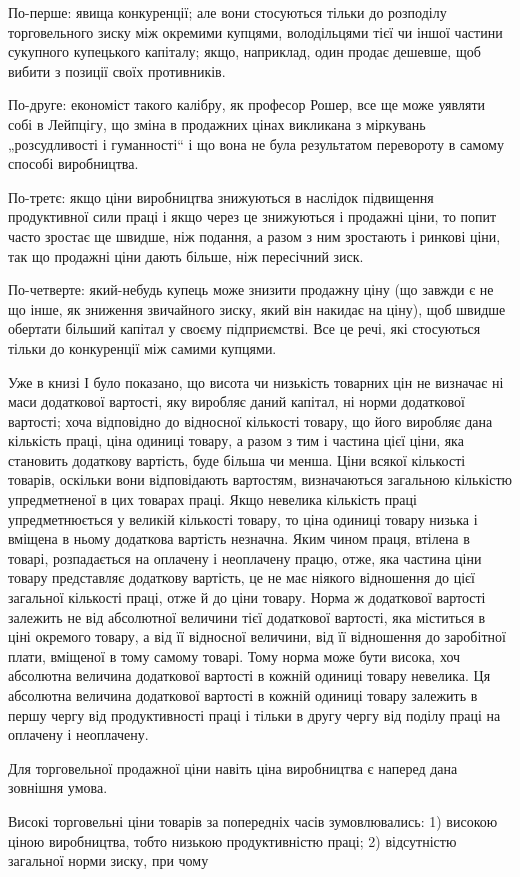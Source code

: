 \parcont{}  %
По-перше: явища конкуренції; але вони стосуються тільки до
розподілу торговельного зиску між окремими купцями, володільцями
тієї чи іншої частини сукупного купецького капіталу; якщо,
наприклад, один продає дешевше, щоб вибити з позиції своїх
противників.

По-друге: економіст такого калібру, як професор Рошер, все
ще може уявляти собі в Лейпцігу, що зміна в продажних цінах
викликана з міркувань „розсудливості і гуманності“ і що вона
не була результатом перевороту в самому способі виробництва.

По-третє: якщо ціни виробництва знижуються в наслідок
підвищення продуктивної сили праці і якщо через це знижуються
і продажні ціни, то попит часто зростає ще швидше, ніж
подання, а разом з ним зростають і ринкові ціни, так що продажні
ціни дають більше, ніж пересічний зиск.

По-четверте: який-небудь купець може знизити продажну
ціну (що завжди є не що інше, як зниження звичайного зиску,
який він накидає на ціну), щоб швидше обертати більший
капітал у своєму підприємстві. Все це речі, які стосуються
тільки до конкуренції між самими купцями.

Уже в книзі І було показано, що висота чи низькість товарних
цін не визначає ні маси додаткової вартості, яку
виробляє даний капітал, ні норми додаткової вартості; хоча
відповідно до відносної кількості товару, що його виробляє
дана кількість праці, ціна одиниці товару, а разом з тим
і частина цієї ціни, яка становить додаткову вартість, буде більша
чи менша. Ціни всякої кількості товарів, оскільки вони відповідають
вартостям, визначаються загальною кількістю упредметненої
в цих товарах праці. Якщо невелика кількість праці
упредметнюється у великій кількості товару, то ціна одиниці
товару низька і вміщена в ньому додаткова вартість незначна.
Яким чином праця, втілена в товарі, розпадається на оплачену
і неоплачену працю, отже, яка частина ціни товару представляє
додаткову вартість, це не має ніякого відношення до цієї загальної
кількості праці, отже й до ціни товару. Норма ж додаткової
вартості залежить не від абсолютної величини тієї
додаткової вартості, яка міститься в ціні окремого товару,
а від її відносної величини, від її відношення до заробітної плати,
вміщеної в тому самому товарі. Тому норма може бути висока,
хоч абсолютна величина додаткової вартості в кожній одиниці
товару невелика. Ця абсолютна величина додаткової вартості
в кожній одиниці товару залежить в першу чергу від продуктивності
праці і тільки в другу чергу від поділу праці на оплачену
і неоплачену.

Для торговельної продажної ціни навіть ціна виробництва є
наперед дана зовнішня умова.

Високі торговельні ціни товарів за попередніх часів зумовлювались:
1) високою ціною виробництва, тобто низькою продуктивністю
праці; 2) відсутністю загальної норми зиску, при чому
\parbreak{}  %
